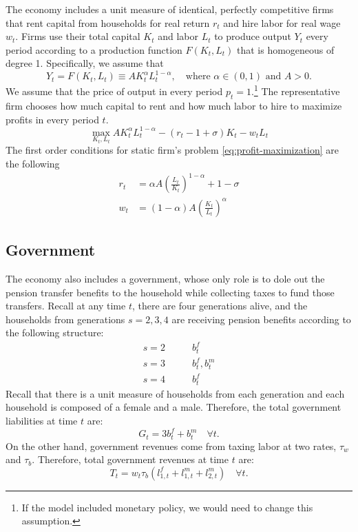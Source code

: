 \documentclass[ProjectUYA]{subfiles}
\begin{document}
The economy includes a unit measure of identical, perfectly competitive firms that rent capital from households for real return $r_t$ and hire labor for real wage $w_t$. Firms use their total capital $K_t$ and labor $L_t$ to produce output $Y_t$ every period according to a production function $F(K_t,L_t)$ that is homogeneous of degree 1. Specifically, we assume that 
\begin{equation}
	\label{eq:production}
		Y_t=F(K_t,L_t)\equiv A K_t^\alpha L_t^{1-\alpha},\quad\text{where $\alpha\in(0,1)$ and $A>0$.}
\end{equation}
We assume that the price of output in every period $p_t=1.$\footnote{If the model included monetary policy, we would need to change this assumption.} The representative firm chooses how much capital to rent and how much labor to hire to maximize profits in every period $t.$
\begin{equation}
	\label{eq:profit-maximization}
	\max_{K_t,L_t} AK_t^\alpha L_t^{1-\alpha}-(r_t-1+\sigma)K_t -w_tL_t
\end{equation}
The first order conditions for static firm's problem \eqref{eq:profit-maximization} are the following
\begin{subequations}
	\label{eq:foc-firms}
	\begin{align}
		r_t&=\alpha A \left(\frac{L_t}{K_t}\right)^{1-\alpha} +1 -\sigma \label{eq:capitalrate} \\
		w_t&=(1-\alpha)A\left(\frac{K_t }{L_t}\right)^\alpha \label{eq:wagerate}
	\end{align}
\end{subequations}

\subsection{Government}

The economy also includes a government, whose only role is to dole out the pension transfer benefits to the household while collecting taxes to fund those transfers. Recall at any time $t$, there are four generations alive, and the households from generations $s=2,3,4$ are receiving pension benefits according to the following structure:
\begin{equation*}
	\begin{aligned}
		s=2 &\qquad b_t^f\\
		s=3 &\qquad b_t^f, b_t^m \\
		s=4 &\qquad b_t^f
	\end{aligned}
\end{equation*}
Recall that there is a unit measure of households from each generation and each household is composed of a female and a male. Therefore, the total government liabilities at time $t$ are:
\begin{equation}
	\label{eq:liabilities-gov}
	G_t= 3b_t^f + b_t^m \quad \forall t.
\end{equation}
On the other hand, government revenues come from taxing labor at two rates, $\tau_w$ and $\tau_b$. Therefore, total government revenues at time $t$ are:
\begin{equation}
	\label{eq:revenues-gov}
	T_t=w_t\tau_b(l_{1,t}^f + l_{1,t}^m+l_{2,t}^m)\quad \forall t.
\end{equation}
\end{document}
